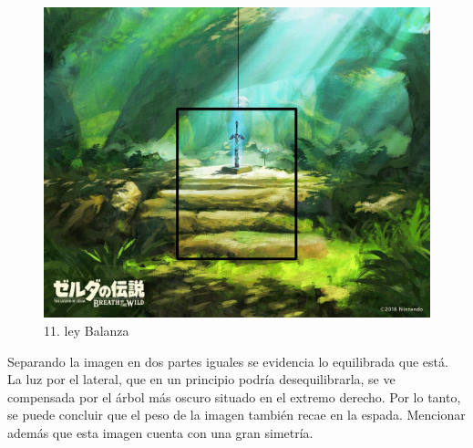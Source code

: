 \documentclass[12pt]{article}
\begin{document}
    \begin{figure}[H]
      \centering
      \includegraphics[width=\textwidth]{images/Carlos/12/Balanza.jpg}
      \caption{\small 11. ley Balanza}
    \end{figure}
    Separando la imagen en dos partes iguales se evidencia lo equilibrada que está. La luz por el lateral, que en un principio podría desequilibrarla, se ve compensada por el árbol más oscuro situado en el extremo derecho. Por lo tanto, se puede concluir que el peso de la imagen también recae en la espada. Mencionar además que esta imagen cuenta con una gran simetría.
\end{document}
